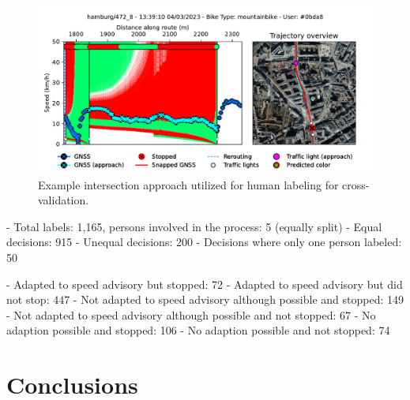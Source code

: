 \begin{figure}[t]
\caption{Example intersection approach utilized for human labeling for cross-validation.}\label{fig:example-trajectory-3.pdf}
\includegraphics[width=\linewidth]{images/example-trajectory-3.pdf}
\end{figure}

- Total labels: 1,165, persons involved in the process: 5 (equally split)
- Equal decisions: 915
- Unequal decisions: 200
- Decisions where only one person labeled: 50

- Adapted to speed advisory but stopped: 72
- Adapted to speed advisory but did not stop: 447
- Not adapted to speed advisory although possible and stopped: 149
- Not adapted to speed advisory although possible and not stopped: 67
- No adaption possible and stopped: 106
- No adaption possible and not stopped: 74

\section{Conclusions}
